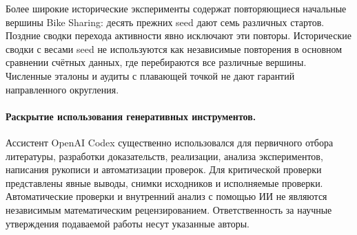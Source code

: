 Более широкие исторические эксперименты содержат повторяющиеся
начальные вершины Bike Sharing: десять прежних seed дают семь
различных стартов. Поздние сводки перехода активности явно исключают
эти повторы. Исторические сводки с весами seed не используются как
независимые повторения в основном сравнении счётных данных, где
перебираются все различные вершины. Численные эталоны и аудиты
с плавающей точкой не дают гарантий направленного округления.

\paragraph{Раскрытие использования генеративных инструментов.}
Ассистент OpenAI Codex существенно использовался для первичного
отбора литературы, разработки доказательств, реализации, анализа
экспериментов, написания рукописи и автоматизации проверок.
Для критической проверки представлены явные выводы, снимки исходников
и исполняемые проверки. Автоматические проверки и внутренний анализ
с помощью ИИ не являются независимым математическим рецензированием.
Ответственность за научные утверждения подаваемой работы несут
указанные авторы.
